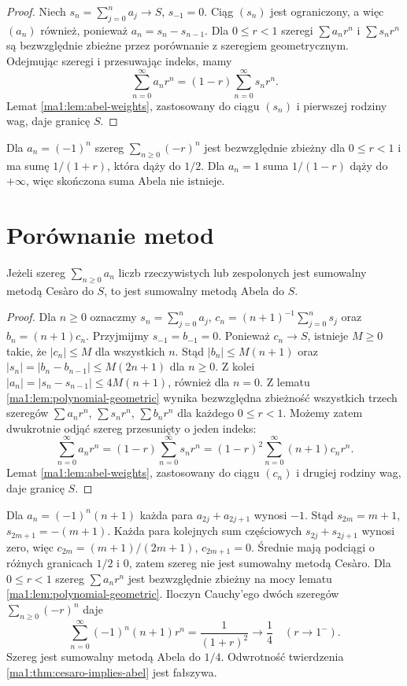 \begin{proof}
Niech $s_n=\sum_{j=0}^n a_j\to S$, $s_{-1}=0$. Ciąg $(s_n)$ jest ograniczony, a więc $(a_n)$ również, ponieważ $a_n=s_n-s_{n-1}$. Dla $0\le r<1$ szeregi $\sum a_nr^n$ i $\sum s_nr^n$ są bezwzględnie zbieżne przez porównanie z szeregiem geometrycznym. Odejmując szeregi i przesuwając indeks, mamy
\[
 \sum_{n=0}^\infty a_nr^n=(1-r)\sum_{n=0}^\infty s_nr^n.
\]
Lemat \ref{ma1:lem:abel-weights}, zastosowany do ciągu $(s_n)$ i pierwszej rodziny wag, daje granicę $S$.
\end{proof}
\begin{przyklad}
\label{ma1:ex:grandi-abel}
Dla $a_n=(-1)^n$ szereg $\sum_{n\ge0}(-r)^n$ jest bezwzględnie zbieżny dla $0\le r<1$ i ma sumę $1/(1+r)$, która dąży do $1/2$. Dla $a_n=1$ suma $1/(1-r)$ dąży do $+\infty$, więc skończona suma Abela nie istnieje.
\end{przyklad}

\section{Porównanie metod}
\begin{twierdzenie}
\label{ma1:thm:cesaro-implies-abel}
Jeżeli szereg $\sum_{n\ge0}a_n$ liczb rzeczywistych lub zespolonych jest sumowalny metodą Cesàro do $S$, to jest sumowalny metodą Abela do $S$.
\end{twierdzenie}
\begin{proof}
Dla $n\ge0$ oznaczmy $s_n=\sum_{j=0}^n a_j$, $c_n=(n+1)^{-1}\sum_{j=0}^n s_j$ oraz $b_n=(n+1)c_n$. Przyjmijmy $s_{-1}=b_{-1}=0$. Ponieważ $c_n\to S$, istnieje $M\ge0$ takie, że $|c_n|\le M$ dla wszystkich $n$. Stąd $|b_n|\le M(n+1)$ oraz
$|s_n|=|b_n-b_{n-1}|\le M(2n+1)$ dla $n\ge0$. Z kolei $|a_n|=|s_n-s_{n-1}|\le4M(n+1)$, również dla $n=0$. Z lematu \ref{ma1:lem:polynomial-geometric} wynika bezwzględna zbieżność wszystkich trzech szeregów $\sum a_nr^n$, $\sum s_nr^n$, $\sum b_nr^n$ dla każdego $0\le r<1$. Możemy zatem dwukrotnie odjąć szereg przesunięty o jeden indeks:
\[
 \sum_{n=0}^\infty a_nr^n=(1-r)\sum_{n=0}^\infty s_nr^n
 =(1-r)^2\sum_{n=0}^\infty(n+1)c_nr^n.
\]
Lemat \ref{ma1:lem:abel-weights}, zastosowany do ciągu $(c_n)$ i drugiej rodziny wag, daje granicę $S$.
\end{proof}
\begin{przyklad}
\label{ma1:ex:abel-not-cesaro}
Dla $a_n=(-1)^n(n+1)$ każda para $a_{2j}+a_{2j+1}$ wynosi $-1$. Stąd $s_{2m}=m+1$, $s_{2m+1}=-(m+1)$. Każda para kolejnych sum częściowych $s_{2j}+s_{2j+1}$ wynosi zero, więc
$c_{2m}=(m+1)/(2m+1)$, $c_{2m+1}=0$. Średnie mają podciągi o różnych granicach $1/2$ i $0$, zatem szereg nie jest sumowalny metodą Cesàro.
Dla $0\le r<1$ szereg $\sum a_nr^n$ jest bezwzględnie zbieżny na mocy lematu \ref{ma1:lem:polynomial-geometric}. Iloczyn Cauchy'ego dwóch szeregów $\sum_{n\ge0}(-r)^n$ daje
\[
 \sum_{n=0}^\infty(-1)^n(n+1)r^n=\frac1{(1+r)^2}\longrightarrow\frac14
 \quad(r\to1^-).
\]
Szereg jest sumowalny metodą Abela do $1/4$. Odwrotność twierdzenia \ref{ma1:thm:cesaro-implies-abel} jest fałszywa.
\end{przyklad}

